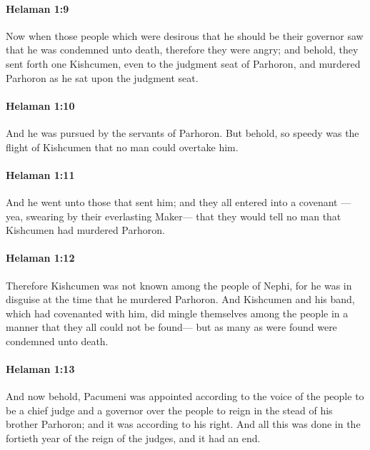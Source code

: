		\paragraph{Helaman 1:9} %
			\label{HELAMAN-1-9}

			Now when those people
			which were desirous that he should be their governor
			saw that he was condemned unto death,
			therefore they were angry;
			and behold, they sent forth one Kishcumen,
			even to the judgment seat of Parhoron,
			and murdered Parhoron as he sat upon the judgment seat.

		\paragraph{Helaman 1:10} %
			\label{HELAMAN-1-10}

			And he was pursued by the servants of Parhoron.
			But behold, so speedy was the flight of Kishcumen
			that no man could overtake him.

		\paragraph{Helaman 1:11} %
			\label{HELAMAN-1-11}

			And he went unto those that sent him;
			and they all entered into a covenant
			---yea, swearing by their everlasting Maker---
			that they would tell no man that Kishcumen had murdered Parhoron.

		\paragraph{Helaman 1:12} %
			\label{HELAMAN-1-12}

			Therefore Kishcumen was not known among the people of Nephi,
			for he was in disguise at the time that he murdered Parhoron.
			And Kishcumen and his band, which had covenanted with him,
			did mingle themselves among the people
			in a manner that they all could not be found---
			but as many as were found were condemned unto death.

		\paragraph{Helaman 1:13} %
			\label{HELAMAN-1-13}

			And now behold, Pacumeni was appointed according to the voice of the people
			to be a chief judge and a governor over the people
			to reign in the stead of his brother Parhoron;
			and it was according to his right.
			And all this was done in the fortieth year of the reign of the judges,
			and it had an end.

